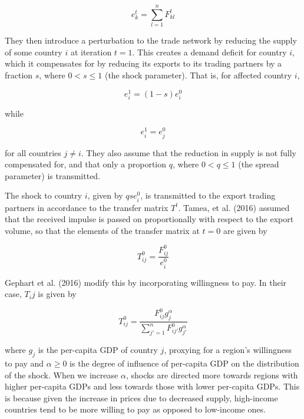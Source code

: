 \documentclass[12pt,letterpaper]{report}
\begin{document}
	\begin{equation}
	\label{eqn:320exports} e_{k}^{t} = \sum_{l = 1}^{n} F_{kl}^{t}
	\end{equation}
	
	They then introduce a perturbation to the trade network by reducing the supply of some country $i$ at iteration $t = 1$. This creates a demand deficit for country $i$, which it compensates for by reducing its exports to its trading partners by a fraction $s$, where $0 < s \leq 1$ (the shock parameter). That is, for affected country $i$,
	
	\begin{equation}
	\label{eqn:321exportShock1} e_{i}^{1} = (1 - s) e_{i}^{0}
	\end{equation}
	
	while 
	
	\begin{equation}
	\label{eqn:322exportShock2} e_{i}^{1} = e_{j}^{0}
	\end{equation}
	
	for all countries $ j \neq i$. They also assume that the reduction in supply is not fully compensated for, and that only a proportion $q$, where $0 < q \leq 1$ (the spread parameter) is transmitted. 
	
	The shock to country $i$, given by $qse_i^{0}$, is transmitted to the export trading partners in accordance to the transfer matrix $T^{t}$. Tamea, et al. (2016) assumed that the received impulse is passed on proportionally with respect to the export volume, so that the elements of the transfer matrix at $t = 0$ are given by
	
	\begin{equation}
	\label{eqn:323transferMatrix1} T_{ij}^{0} = \frac{F_{ij}^{0}}{e_{i}^{0}}
	\end{equation}
	
	Gephart et al. (2016) modify this by incorporating willingness to pay. In their case, $T_ij$ is given by
	
	\begin{equation}
	\label{eqn:324transferMatrix2} T_{ij}^{0} = \frac{F_{ij}^{0}g_{j}^{\alpha}}{\sum_{j' = 1}^{n} F_{ij'}^{0}g_{j'}^{\alpha}}
	\end{equation}
	
	where $g_{j}$ is the per-capita GDP of country $j$, proxying for a region's willingness to pay and $\alpha \geq 0$ is the degree of influence of per-capita GDP on the distribution of the shock. When we increase $\alpha$, shocks are directed more towards regions with higher per-capita GDPs and less towards those with lower per-capita GDPs. This is because given the increase in prices due to decreased supply, high-income countries tend to be more willing to pay as opposed to low-income ones.
	
\end{document}

